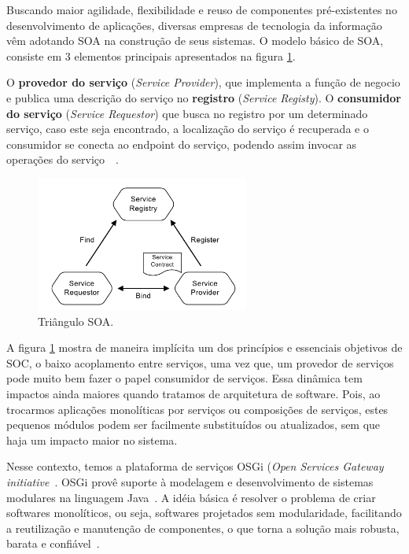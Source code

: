 Buscando maior agilidade, flexibilidade e reuso de componentes pré-existentes no desenvolvimento de aplicações, diversas empresas de tecnologia da informação vêm adotando SOA na construção de seus sistemas. O modelo básico de SOA, consiste em 3 elementos principais apresentados na figura \ref{fig:soatriangle}.

O \textbf{provedor do serviço} (\textit{Service Provider}), que implementa a função de negocio e publica uma descrição do serviço no \textbf{registro} (\textit{Service Registy}). O \textbf{consumidor do serviço} (\textit{Service Requestor}) que busca no registro por um determinado serviço, caso este seja encontrado, a localização do serviço é recuperada e o consumidor se conecta ao endpoint do serviço, podendo assim invocar as operações do serviço~\cite{michlmayr2007towards}~\cite{huhns2005service}.

\begin{figure}[htp]
\centering
\includegraphics[width=7cm]{chapters/intro/soa_triangle.png}
\caption[Triângulo SOA]{Triângulo SOA.}
\label{fig:soatriangle}
\end{figure}

A figura \ref{fig:soatriangle} mostra de maneira implícita um dos princípios e essenciais objetivos de SOC, o baixo acoplamento entre serviços, uma vez que, um provedor de serviços pode muito bem fazer o papel consumidor de serviços. Essa dinâmica tem impactos ainda maiores quando tratamos de arquitetura de software. Pois, ao trocarmos aplicações monolíticas por serviços ou composições de serviços, estes pequenos módulos podem ser facilmente substituídos ou atualizados, sem que haja um impacto maior no sistema.

Nesse contexto, temos a plataforma de serviços OSGi (\textit{Open Services Gateway initiative}~\cite{alliance2007osgi}. OSGi provê suporte à modelagem e desenvolvimento de sistemas modulares na linguagem Java~\cite{hall2010osgi}. A idéia básica é resolver o problema de criar softwares monolíticos, ou seja, softwares projetados sem modularidade, facilitando a reutilização e manutenção de  componentes, o que torna a solução mais robusta, barata e confiável~\cite{davis2009open}.

